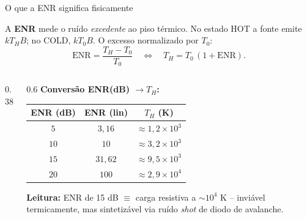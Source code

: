 \begin{frame}{O que a ENR significa fisicamente}

\small A \textbf{ENR} mede o ruído \emph{excedente} ao piso térmico. No estado HOT a fonte emite $k T_H B$; no COLD, $k T_0 B$. O excesso normalizado por $T_0$:
\[
\text{ENR} = \frac{T_H - T_0}{T_0} \quad\Longleftrightarrow\quad T_H = T_0\,(1 + \text{ENR}).
\]

\begin{columns}[T]
\begin{column}{0.38\textwidth}
\centering
{}
\end{column}
\begin{column}{0.6\textwidth}
\textbf{Conversão ENR(dB) $\to T_H$:}

\vspace{0.1cm}
\begin{center}
\footnotesize
\begin{tabular}{|c|c|c|}
\hline
ENR (dB) & ENR (lin) & $T_H$ (K) \\
\hline
$5$  & $3{,}16$  & $\approx 1{,}2 \times 10^{3}$ \\
$10$ & $10$      & $\approx 3{,}2 \times 10^{3}$ \\
$15$ & $31{,}62$ & $\approx 9{,}5 \times 10^{3}$ \\
$20$ & $100$     & $\approx 2{,}9 \times 10^{4}$ \\
\hline
\end{tabular}
\end{center}

\vspace{0.1cm}

{\small \textbf{Leitura:} ENR de 15 dB $\equiv$ carga resistiva a $\sim 10^4$ K -- inviável termicamente, mas sintetizável via ruído \emph{shot} de diodo de avalanche.}
\end{column}
\end{columns}

\end{frame}

